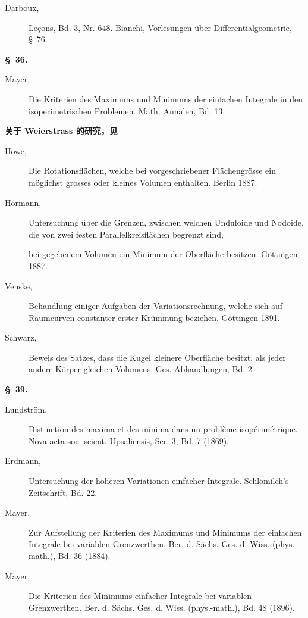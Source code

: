 \documentclass[11pt,a4paper,leqno]{article}
\begin{document}
\begin{description}
\item[Darboux,] Leçons, Bd. 3, Nr. 648. Bianchi, Vorlesungen über
Differentialgeometrie, \S~76.
\end{description}

\begin{center}{\bfseries \S~36.}\end{center}

\begin{description}
\item[Mayer,] Die Kriterien des Maximums und Minimums der einfachen Integrale
in den isoperi\-metrischen Problemen. Math. Annalen, Bd. 13.
\end{description}

\begin{center}{\bfseries 关于 Weierstrass 的研究，见}\end{center}

\begin{description}
\item[Howe,] Die Rotationsflächen, welche bei vorgeschriebener Flächengrösse
ein möglichst grosses oder kleines Volumen enthalten. Berlin 1887.

\item[Hormann,] Untersuchung über die Grenzen, zwischen welchen Unduloide und
Nodoide, die von zwei festen Parallelkreisflächen begrenzt sind,

bei gegebenem Volumen ein Minimum der Oberfläche besitzen. Göttingen 1887.

\item[Venske,] Behandlung einiger Aufgaben der Variationsrechnung, welche sich
auf Raumcurven constanter erster Krümmung beziehen. Göttingen 1891.

\item[Schwarz,] Beweis des Satzes, dass die Kugel kleinere Oberfläche besitzt,
als jeder andere Körper gleichen Volumens. Ges. Abhandlungen, Bd. 2.
\end{description}

\begin{center}{\bfseries \S~39.}\end{center}

\begin{description}
\item[Lundström,] Distinction des maxima et des minima dans un problème
isopérimétrique. Nova acta soc. scient. Upsaliensis, Ser. 3, Bd. 7 (1869).

\item[Erdmann,] Untersuchung der höheren Variationen einfacher Integrale.
Schlömilch's Zeitschrift, Bd. 22.

\item[Mayer,] Zur Aufstellung der Kriterien des Maximums und Minimums der
einfachen Integrale bei variablen Grenzwerthen. Ber. d. Sächs. Ges. d. Wiss.
(phys.-math.), Bd. 36 (1884).

\item[Mayer,] Die Kriterien des Minimums einfacher Integrale bei variablen
Grenzwerthen. Ber. d. Sächs. Ges. d. Wiss. (phys.-math.), Bd. 48 (1896).
\end{description}
\end{document}
